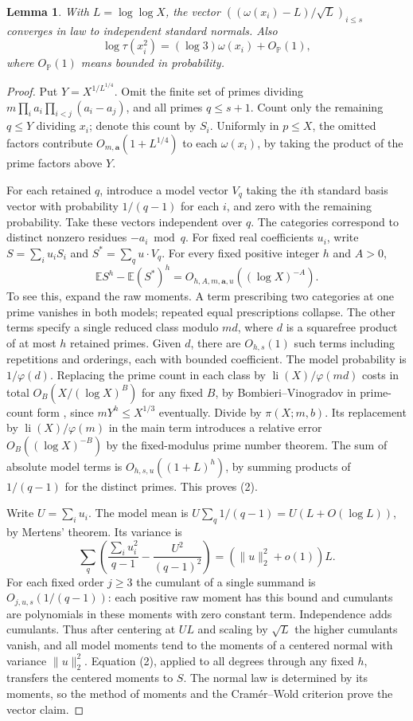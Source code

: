 \documentclass[11pt]{article}
\newtheorem{lemma}[theorem]{Lemma}
\newcommand{\PP}{\mathbb P}
\newcommand{\EE}{\mathbb E}
\begin{document}
\begin{lemma}\label{ek}
With $L=\log\log X$, the vector $((\omega(x_i)-L)/\sqrt L)_{i\le s}$ converges in law to independent standard normals. Also
\[
 \log\tau(x_i^2)=(\log 3)\omega(x_i)+O_{\PP}(1),
\]
where $O_{\PP}(1)$ means bounded in probability.
\end{lemma}
\begin{proof}
Put $Y=X^{1/L^{1/4}}$. Omit the finite set of primes dividing $m\prod_i a_i\prod_{i<j}(a_i-a_j)$, and all primes $q\le s+1$. Count only the remaining $q\le Y$ dividing $x_i$; denote this count by $S_i$. Uniformly in $p\le X$, the omitted factors contribute $O_{m,\mathbf a}(1+L^{1/4})$ to each $\omega(x_i)$, by taking the product of the prime factors above $Y$.

For each retained $q$, introduce a model vector $V_q$ taking the $i$th standard basis vector with probability $1/(q-1)$ for each $i$, and zero with the remaining probability. Take these vectors independent over $q$. The categories correspond to distinct nonzero residues $-a_i\bmod q$. For fixed real coefficients $u_i$, write $S=\sum_i u_i S_i$ and $S^*=\sum_q u\cdot V_q$. For every fixed positive integer $h$ and $A>0$,
\[
 \EE S^h-\EE(S^*)^h=O_{h,A,m,\mathbf a,u}((\log X)^{-A}).
 \tag{2}
\]
To see this, expand the raw moments. A term prescribing two categories at one prime vanishes in both models; repeated equal prescriptions collapse. The other terms specify a single reduced class modulo $md$, where $d$ is a squarefree product of at most $h$ retained primes. Given $d$, there are $O_{h,s}(1)$ such terms including repetitions and orderings, each with bounded coefficient. The model probability is $1/\varphi(d)$. Replacing the prime count in each class by $\operatorname{li}(X)/\varphi(md)$ costs in total $O_B(X/(\log X)^B)$ for any fixed $B$, by Bombieri--Vinogradov in prime-count form \cite{BV}, since $mY^h\le X^{1/3}$ eventually. Divide by $\pi(X;m,b)$. Its replacement by $\operatorname{li}(X)/\varphi(m)$ in the main term introduces a relative error $O_B((\log X)^{-B})$ by the fixed-modulus prime number theorem. The sum of absolute model terms is $O_{h,s,u}((1+L)^h)$, by summing products of $1/(q-1)$ for the distinct primes. This proves (2).

Write $U=\sum_i u_i$. The model mean is $U\sum_q1/(q-1)=U(L+O(\log L))$, by Mertens' theorem. Its variance is
\[
 \sum_q\left(\frac{\sum_i u_i^2}{q-1}-\frac{U^2}{(q-1)^2}\right)
   =(\|u\|_2^2+o(1))L.
\]
For each fixed order $j\ge3$ the cumulant of a single summand is $O_{j,u,s}(1/(q-1))$: each positive raw moment has this bound and cumulants are polynomials in these moments with zero constant term. Independence adds cumulants. Thus after centering at $UL$ and scaling by $\sqrt L$ the higher cumulants vanish, and all model moments tend to the moments of a centered normal with variance $\|u\|_2^2$. Equation (2), applied to all degrees through any fixed $h$, transfers the centered moments to $S$. The normal law is determined by its moments, so the method of moments and the Cram\'er--Wold criterion prove the vector claim.


\end{proof}
\end{document}
